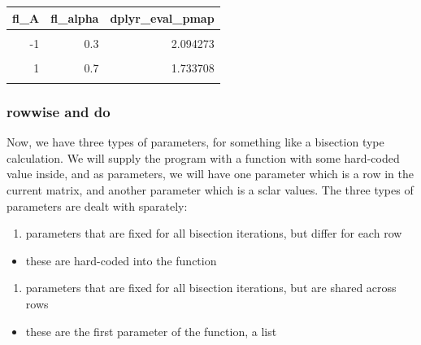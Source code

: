 \documentclass[
]{book}
\providecommand{\tightlist}{%
  \setlength{\itemsep}{0pt}\setlength{\parskip}{0pt}}
\begin{document}
\begin{table}[!h]
\centering
\begin{tabular}{r|r|r}
\hline
fl\_A & fl\_alpha & dplyr\_eval\_pmap\\
\hline
\cellcolor{gray!6}{-2} & \cellcolor{gray!6}{0.1} & \cellcolor{gray!6}{2.346356}\\
\hline
-1 & 0.3 & 2.094273\\
\hline
\cellcolor{gray!6}{0} & \cellcolor{gray!6}{0.5} & \cellcolor{gray!6}{1.895316}\\
\hline
1 & 0.7 & 1.733708\\
\hline
\cellcolor{gray!6}{2} & \cellcolor{gray!6}{0.9} & \cellcolor{gray!6}{1.599477}\\
\hline
\end{tabular}
\end{table}

\hypertarget{rowwise-and-do}{%
\subsubsection{rowwise and do}\label{rowwise-and-do}}

Now, we have three types of parameters, for something like a bisection type calculation. We will supply the program with a function with some hard-coded value inside, and as parameters, we will have one parameter which is a row in the current matrix, and another parameter which is a sclar values. The three types of parameters are dealt with sparately:

\begin{enumerate}
\def\labelenumi{\arabic{enumi}.}
\tightlist
\item
  parameters that are fixed for all bisection iterations, but differ for each row
\end{enumerate}

\begin{itemize}
\tightlist
\item
  these are hard-coded into the function
\end{itemize}

\begin{enumerate}
\def\labelenumi{\arabic{enumi}.}
\setcounter{enumi}{1}
\tightlist
\item
  parameters that are fixed for all bisection iterations, but are shared across rows
\end{enumerate}

\begin{itemize}
\tightlist
\item
  these are the first parameter of the function, a list
\end{itemize}
\end{document}
